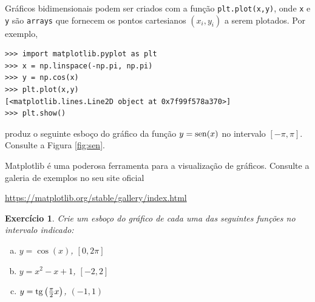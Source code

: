 \documentclass[12pt]{article}
\newtheorem{exr}{Exercício}[section]
\begin{document}
Gráficos bidimensionais podem ser criados com a função \lstinline+plt.plot(x,y)+, onde \lstinline+x+ e \lstinline+y+ são \lstinline+arrays+ que fornecem os pontos cartesianos $(x_i, y_i)$ a serem plotados. Por exemplo,
\begin{lstlisting}
>>> import matplotlib.pyplot as plt
>>> x = np.linspace(-np.pi, np.pi)
>>> y = np.cos(x)
>>> plt.plot(x,y)
[<matplotlib.lines.Line2D object at 0x7f99f578a370>]
>>> plt.show()
\end{lstlisting}
produz o seguinte esboço do gráfico da função $y=\operatorname{sen}(x)$ no intervalo $[-\pi,\pi]$. Consulte a Figura \ref{fig:sen}.


\begin{obs}
  Matplotlib é uma poderosa ferramenta para a visualização de gráficos. Consulte a galeria de exemplos no seu site oficial
  \begin{center}
    \url{https://matplotlib.org/stable/gallery/index.html}
  \end{center}
\end{obs}

\begin{exr}
  Crie um esboço do gráfico de cada uma das seguintes funções no intervalo indicado:
  \begin{enumerate}[a)]
  \item $y = \cos(x)$, $\left[0, 2\pi\right]$
  \item $y = x^2 - x + 1$, $[-2, 2]$
  \item $y = \operatorname{tg}\left(\frac{\pi}{2}x\right)$, $(-1, 1)$
  \end{enumerate}
\end{exr}


\end{document}

